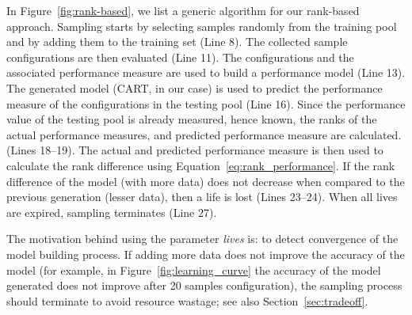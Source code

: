\documentclass[sigconf]{acmart}
\begin{document}
In Figure~\ref{fig:rank-based}, we list a generic algorithm for our rank-based approach. Sampling starts by selecting samples randomly from the training pool and by adding them to the training set (Line 8). The collected sample configurations are then evaluated (Line 11). The configurations and the associated performance measure are used to build a performance model (Line 13). The generated model (CART, in our case) is used to predict the performance measure of the configurations in the testing pool (Line 16). Since the performance value of the testing pool is already measured, hence known, the ranks of the actual performance measures, and predicted performance measure are calculated. (Lines 18--19). The actual and predicted performance measure is then used to calculate the rank difference using Equation~\ref{eq:rank_performance}. If the rank difference of the model (with more data) does not decrease  when compared to the previous generation (lesser data), then a life is lost (Lines 23--24). When all lives are expired, sampling terminates (Line 27).

The motivation behind using the parameter \textit{lives} is: to detect convergence of the model building process. If adding more data does not improve the accuracy of the model (for example, in Figure~\ref{fig:learning_curve} the accuracy of the model generated does not improve after 20 samples configuration), the sampling process should terminate to avoid resource wastage; see also Section~\ref{sec:tradeoff}.
\end{document}
